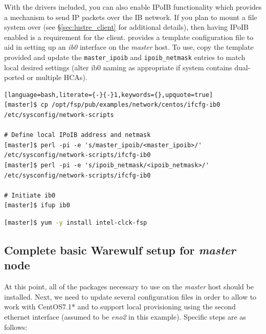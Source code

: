 \documentclass[letterpaper]{article}
\newcommand{\baseOS}{CentOS7.1*}
\begin{document}
With the \InfiniBand{} drivers included, you can also enable IPoIB functionality
which provides a mechanism to send IP packets over the IB network. If you plan
to mount a \Lustre{} file system over \InfiniBand{} (see \S\ref{sec:lustre_client}
for additional details), then having IPoIB enabled is a requirement for the
\Lustre{} client. \FSP{} provides a template configuration file to aid in setting up
an {\em ib0} interface on the {\em master} host. To use, copy the template
provided and update the \texttt{master\_ipoib} and
\texttt{ipoib\_netmask} entries to match local desired settings (alter ib0
naming as appropriate if system contains dual-ported or multiple HCAs). 

\begin{lstlisting}[language=bash,literate={-}{-}1,keywords={},upquote=true]
[master]$ cp /opt/fsp/pub/examples/network/centos/ifcfg-ib0 /etc/sysconfig/network-scripts

# Define local IPoIB address and netmask
[master]$ perl -pi -e 's/master_ipoib/<master_ipoib>/' /etc/sysconfig/network-scripts/ifcfg-ib0
[master]$ perl -pi -e 's/ipoib_netmask/<ipoib_netmask>/' /etc/sysconfig/network-scripts/ifcfg-ib0

# Initiate ib0
[master]$ ifup ib0
\end{lstlisting}



\begin{lstlisting}[language=bash,keywords={}]
[master]$ yum -y install intel-clck-fsp
\end{lstlisting}


\subsection{Complete basic Warewulf setup for {\em master} node}

At this point, all of the packages necessary to use \Warewulf{} on the {\em
  master} host should be installed.  Next, we need to update several
configuration files in order to allow \Warewulf{} to work with \baseOS{} and to support
local provisioning using the second ethernet interface (assumed to be {\em
  eno2} in this example).  Specific steps are as
follows:

\end{document}
